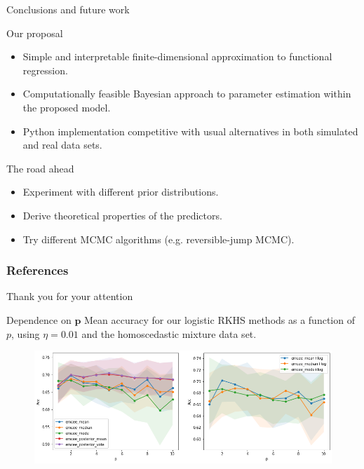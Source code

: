 \documentclass[9pt, english, professionalfonts]{beamer}
\begin{document}
\begin{frame}{Conclusions and future work}

 \begin{alertblock}{Our proposal}
   \begin{itemize}
     \item Simple and interpretable finite-dimensional approximation to functional regression.
     \item Computationally feasible Bayesian approach to parameter estimation within the proposed model.
     \item Python implementation competitive with usual alternatives in both simulated and real data sets.
   \end{itemize}
 \end{alertblock}

\pause

 \begin{exampleblock}{The road ahead}
   \begin{itemize}
     \item Experiment with different prior distributions.
     \item Derive theoretical properties of the predictors.
     \item Try different MCMC algorithms (e.g. reversible-jump MCMC).
   \end{itemize}
 \end{exampleblock}

\end{frame}

\begin{frame}
    \frametitle{References}
    \nocite{*}
    \printbibliography[heading=none]
\end{frame}

\appendix

\begin{frame}[standout]
  Thank you for your attention
\end{frame}



\begin{frame}{Dependence on \(\bm p\)}
Mean accuracy for our logistic RKHS methods as a function of \(p\), using \(\eta=0.01\) and the homoscedastic mixture data set.

\vspace{1em}

\begin{figure}
  \centering
  \includegraphics[width=.95\textwidth]{mixture_dependence_acc_p}
  \caption*{}
\end{figure}
\end{frame}
\end{document}
